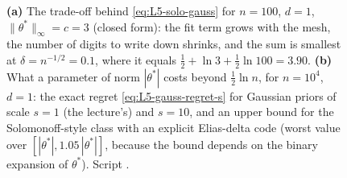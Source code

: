 \begin{figure}[tb]
\caption{\textbf{(a)} The trade-off behind \eqref{eq:L5-solo-gauss} for $n=100$, $d=1$, $\|\theta^*\|_\infty=c=3$ (closed form): the fit term grows with the mesh, the number of digits to write down shrinks, and the sum is smallest at $\delta=n^{-1/2}=0.1$, where it equals $\frac12+\ln3+\frac12\ln100=3.90$. \textbf{(b)} What a parameter of norm $|\theta^*|$ costs beyond $\frac12\ln n$, for $n=10^4$, $d=1$: the exact regret \eqref{eq:L5-gauss-regret-s} for Gaussian priors of scale $s=1$ (the lecture's) and $s=10$, and an upper bound for the Solomonoff-style class with an explicit Elias-delta code (worst value over $[|\theta^*|,1.05\,|\theta^*|]$, because the bound depends on the binary expansion of $\theta^*$). Script .}
\label{fig:L5-trade}
\end{figure}

